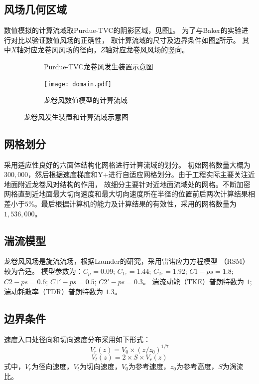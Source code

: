 \subsection{风场几何区域}
数值模拟的计算流域取Purdue-TVC的阴影区域，见图\ref{fig:Ward-TVC}。
为了与Baker\cite{baker1981boundary}的实验进行对比以验证数值风场的正确性，
取计算流域的尺寸及边界条件如图\ref{fig:tornado-domain}所示。
其中$X$轴对应龙卷风风场的径向，$Z$轴对应龙卷风风场的竖向。
\begin{figure}[!htbp]
  \begin{subfigure}[b]{0.5\textwidth}
    \centering
    
    \caption{Purdue-TVC龙卷风发生装置示意图}\label{fig:Ward-TVC}
  \end{subfigure}
  \begin{subfigure}[b]{0.5\textwidth}
    \centering
    \texttt{[image: domain.pdf]}
    \caption{龙卷风数值模型的计算流域}\label{fig:tornado-domain}
  \end{subfigure}
  \caption{龙卷风发生装置和计算流域示意图}\label{fig:TVC-domain}
\end{figure}


\subsection{网格划分}
采用适应性良好的六面体结构化网格进行计算流域的划分。
初始网格数量大概为$300,000$，然后根据速度梯度和Y+进行自适应网格划分\cite{fluent2015user}。由于工程实际主要关注近地面附近龙卷风对结构的作用，
故细分主要针对近地面流域处的网格。不断加密网格直到近地面最大切向速度和最大切向速度所在半径的位置前后两次计算结果相差小于$5\%$。最后根据计算机的能力及计算结果的有效性，采用的网格数量为$1,536,000$。


\subsection{湍流模型}
龙卷风风场是旋流流场，根据Launder\cite{launder1989second}的研究，采用雷诺应力方程模型 （RSM）较为合适。
模型参数为：$C_{\mu}=0.09$; $C_{1\varepsilon}=1.44$; $C_{2\varepsilon}=1.92$; 
$C1-ps=1.8$; $C2-ps=0.6$; $C1'-ps=0.5$; $C2'-ps=0.3$。
湍流动能（TKE）普朗特数为 $1$; 湍动耗散率（TDR）普朗特数为 $1.3$。

\subsection{边界条件}
速度入口处径向和切向速度分布采用如下形式：
\begin{equation}\label{eqn:Vr}
  V_r(z) = V_0 \times (z/z_0)^{1/7}
\end{equation}
\begin{equation}\label{eqn:Vt}
  V_t(z) = 2 \times S \times V_r(z)
\end{equation}
式中，$V_r$为径向速度，$V_t$为切向速度，$V_0$为参考速度，$z_0$为参考高度，$S$为涡流比。

